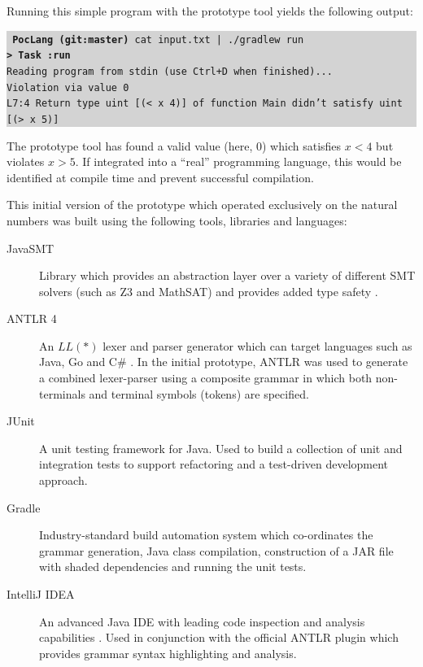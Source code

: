 \documentclass[a4paper]{article}
\newcommand{\termbox}[1] {\colorbox{lightgrey}{\parbox{\textwidth}{\vspace{.75\baselineskip}\centering\parbox{0.95\textwidth}{ \sffamily#1\vspace{.75\baselineskip}}}}}
\begin{document}
    Running this simple program with the prototype tool yields the following output:
    

    \termbox{
        \texttt{\textcolor{term-green}{\fallbackmono{➜}} \ttfamily \textbf{\textcolor{term-dir}{PocLang} \textcolor{term-git}{(git:}\textcolor{term-branch}{master}\textcolor{term-git}{)}} cat input.txt | ./gradlew run}\\
        \texttt{\textbf{> Task :run}}\\
        \textcolor{term-green}{\texttt{Reading program from stdin (use Ctrl+D when finished)...}}\\
        \textcolor{id7-ruby-red}{\texttt{Violation via value 0}}\\
        \textcolor{id7-ruby-red}{\texttt{L7:4 Return type uint [(< x 4)] of function Main didn't satisfy uint [(> x 5)]}}
    }
    
    The prototype tool has found a valid value (here, $0$) which satisfies $x < 4$ but violates $x > 5$. If integrated into a ``real'' programming language, this would be identified at compile time and prevent successful compilation.
    
    This initial version of the prototype which operated exclusively on the natural numbers was built using the following tools, libraries and languages:
    
    \begin{description}
        \item[JavaSMT] Library which provides an abstraction layer over a variety of different SMT solvers (such as Z3 and MathSAT) and provides added type safety \citep{karpenkov2016javasmt}.
        \item[ANTLR 4] An $LL(*)$ lexer and parser generator which can target languages such as Java, Go and C\# \citep{parr2011ll}. In the initial prototype, ANTLR was used to generate a combined lexer-parser using a composite grammar in which both non-terminals and terminal symbols (tokens) are specified.
        \item[JUnit] A unit testing framework for Java. Used to build a collection of unit and integration tests to support refactoring and a test-driven development approach.
        \item[Gradle] Industry-standard build automation system which co-ordinates the grammar generation, Java class compilation, construction of a JAR file with shaded dependencies and running the unit tests.
        \item[IntelliJ IDEA] An advanced Java IDE with leading code inspection and analysis capabilities \citep{ideainspections} \citep{Jemerov:2008:IRI:1636642.1636655}. Used in conjunction with the official ANTLR plugin which provides grammar syntax highlighting and analysis.
    \end{description}
\end{document}
